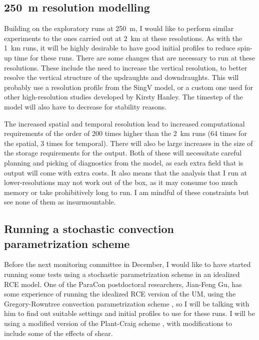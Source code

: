 \documentclass[11pt,a4paper]{article}
\begin{document}
\subsection{\SI{250}{m} resolution modelling}
\label{sec:250m_res}

Building on the exploratory runs at \SI{250}{m}, I would like to perform similar experiments to the ones carried out at \SI{2}{km} at these resolutions. As with the \SI{1}{km} runs, it will be highly desirable to have good initial profiles to reduce spin-up time for these runs. There are some changes that are necessary to run at these resolutions. These include the need to increase the vertical resolution, to better resolve the vertical structure of the updraughts and downdraughts. This will probably use a resolution profile from the SingV model, or a custom one used for other high-resolution studies developed by Kirsty Hanley. The timestep of the model will also have to decrease for stability reasons. 

The increased spatial and temporal resolution lead to increased computational requirements of the order of 200 times higher than the \SI{2}{km} runs (64 times for the spatial, 3 times for temporal). There will also be large increases in the size of the storage requirements for the output. Both of these will necessitate careful planning and picking of diagnostics from the model, as each extra field that is output will come with extra costs. It also means that the analysis that I run at lower-resolutions may not work out of the box, as it may consume too much memory or take prohibitively long to run. I am mindful of these constraints but see none of them as insurmountable.

\subsection{Running a stochastic convection parametrization scheme}

Before the next monitoring committee in December, I would like to have started running some tests using a stochastic parametrization scheme in an idealized RCE model. One of the ParaCon postdoctoral researchers, Jian-Feng Gu, has some experience of running the idealized RCE version of the UM, using the Gregory-Rowntree convection parametrization scheme \parencite{gregory1990mass}, so I will be talking with him to find out suitable settings and initial profiles to use for these runs. I will be using a modified version of the Plant-Craig scheme \parencite{plant2008stochastic}, with modifications to include some of the effects of shear.
\end{document}

